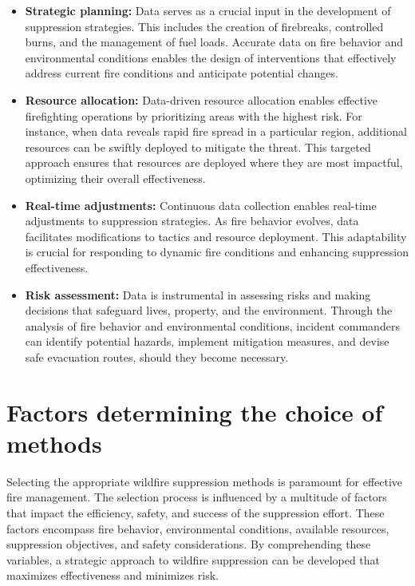 \documentclass[
  12 pt,
]{Nemilov}
\begin{document}
\begin{itemize}
\item
  \textbf{Strategic planning:} Data serves as a crucial input in the development of suppression strategies. This includes the creation of firebreaks, controlled burns, and the management of fuel loads. Accurate data on fire behavior and environmental conditions enables the design of interventions that effectively address current fire conditions and anticipate potential changes.
\item
  \textbf{Resource allocation:} Data-driven resource allocation enables effective firefighting operations by prioritizing areas with the highest risk. For instance, when data reveals rapid fire spread in a particular region, additional resources can be swiftly deployed to mitigate the threat. This targeted approach ensures that resources are deployed where they are most impactful, optimizing their overall effectiveness.
\item
  \textbf{Real-time adjustments:} Continuous data collection enables real-time adjustments to suppression strategies. As fire behavior evolves, data facilitates modifications to tactics and resource deployment. This adaptability is crucial for responding to dynamic fire conditions and enhancing suppression effectiveness.
\item
  \textbf{Risk assessment:} Data is instrumental in assessing risks and making decisions that safeguard lives, property, and the environment. Through the analysis of fire behavior and environmental conditions, incident commanders can identify potential hazards, implement mitigation measures, and devise safe evacuation routes, should they become necessary.
\end{itemize}

\section{Factors determining the choice of methods}\label{factors-determining-the-choice-of-methods}

Selecting the appropriate wildfire suppression methods is paramount for effective fire management. The selection process is influenced by a multitude of factors that impact the efficiency, safety, and success of the suppression effort. These factors encompass fire behavior, environmental conditions, available resources, suppression objectives, and safety considerations. By comprehending these variables, a strategic approach to wildfire suppression can be developed that maximizes effectiveness and minimizes risk.
\end{document}
